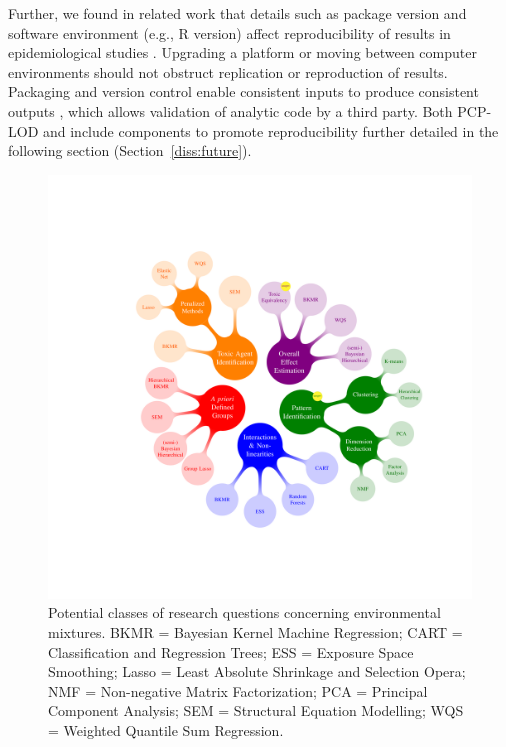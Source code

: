 Further, we found in related work that details such as package version and software environment (e.g., R version) affect reproducibility of results in epidemiological studies \citep{nunez2020reflection}. Upgrading a platform or moving between computer environments should not obstruct replication or reproduction of results. Packaging and version control enable consistent inputs to produce consistent outputs \citep{wilson2014best}, which allows validation of analytic code by a third party. Both PCP-LOD and \bnmf include components to promote reproducibility further detailed in the following section (Section~\ref{diss:future}).

\begin{figure}[!ht]
\centering
\includegraphics[scale = 0.286]{./figures/gibson_dissertation_image.pdf}
\caption{Potential classes of research questions concerning environmental mixtures. BKMR = Bayesian Kernel Machine Regression; CART = Classification and Regression Trees; ESS = Exposure Space Smoothing; Lasso = Least Absolute Shrinkage and Selection Opera; NMF = Non-negative Matrix Factorization; PCA = Principal Component Analysis; SEM = Structural Equation Modelling; WQS = Weighted Quantile Sum Regression.}
\label{fig:blobs}
\end{figure}

